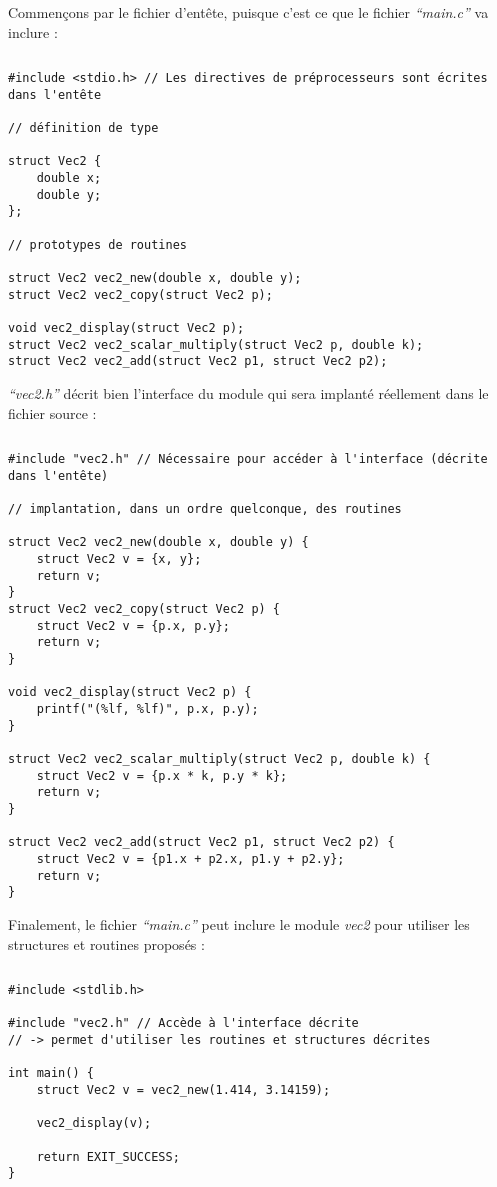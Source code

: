 \documentclass[../../../main.tex]{subfiles}
\begin{document}
Commençons par le fichier d'entête, puisque c'est ce que le fichier \textit{``main.c''} va inclure :
\begin{lstlisting}[title=vec2.h]
\end{lstlisting}
\begin{verbatim}
#include <stdio.h> // Les directives de préprocesseurs sont écrites dans l'entête

// définition de type

struct Vec2 {
	double x;
	double y;
};

// prototypes de routines

struct Vec2 vec2_new(double x, double y);
struct Vec2 vec2_copy(struct Vec2 p);

void vec2_display(struct Vec2 p);
struct Vec2 vec2_scalar_multiply(struct Vec2 p, double k);
struct Vec2 vec2_add(struct Vec2 p1, struct Vec2 p2);
\end{verbatim}
\textit{``vec2.h''} décrit bien l'interface du module qui sera implanté réellement dans le fichier source :
\begin{lstlisting}[title=vec2.c]
\end{lstlisting}
\begin{verbatim}
#include "vec2.h" // Nécessaire pour accéder à l'interface (décrite dans l'entête)

// implantation, dans un ordre quelconque, des routines

struct Vec2 vec2_new(double x, double y) {
	struct Vec2 v = {x, y};
	return v;
}
struct Vec2 vec2_copy(struct Vec2 p) {
	struct Vec2 v = {p.x, p.y};
	return v;
}

void vec2_display(struct Vec2 p) {
	printf("(%lf, %lf)", p.x, p.y);
}

struct Vec2 vec2_scalar_multiply(struct Vec2 p, double k) {
	struct Vec2 v = {p.x * k, p.y * k};
	return v;
}

struct Vec2 vec2_add(struct Vec2 p1, struct Vec2 p2) {
	struct Vec2 v = {p1.x + p2.x, p1.y + p2.y};
	return v;
}
\end{verbatim}
Finalement, le fichier \textit{``main.c''} peut inclure le module \textit{vec2} pour utiliser les structures et routines proposés :
\begin{lstlisting}[title=main.c]
\end{lstlisting}
\begin{verbatim}
#include <stdlib.h>

#include "vec2.h" // Accède à l'interface décrite
// -> permet d'utiliser les routines et structures décrites

int main() {
	struct Vec2 v = vec2_new(1.414, 3.14159);

	vec2_display(v);

	return EXIT_SUCCESS;
}
\end{verbatim}
\end{document}
